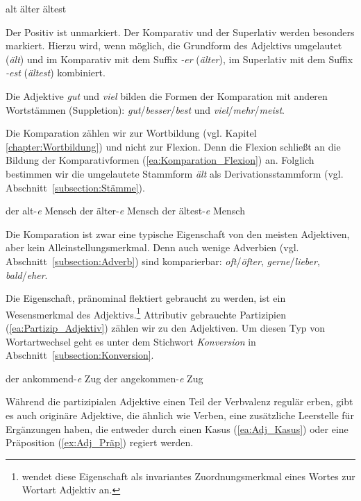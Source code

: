 \ea \label{ea:Komparation}
\ea \label{ea:Positiv} alt
\ex \label{ex:Komparativ} älter
\ex \label{ex:Superlativ} ältest
\z 
\z 

Der Positiv ist unmarkiert. Der Komparativ und der Superlativ werden besonders markiert. Hierzu wird, wenn möglich, die Grundform des Adjektivs umgelautet (\textit{ält}) und im Komparativ mit dem Suffix \textit{-er} (\textit{älter}), im Superlativ mit dem Suffix \textit{-est} (\textit{ältest}) kombiniert. 

Die Adjektive \textit{gut} und \textit{viel} bilden die Formen der Komparation mit anderen Wortstämmen (Suppletion): \textit{gut}/\textit{besser}/\textit{best} und \textit{viel}/\textit{mehr}/\textit{meist}.

Die Komparation zählen wir zur Wortbildung (vgl. Kapitel \ref{chapter:Wortbildung}) und nicht zur Flexion. Denn die Flexion schließt an die Bildung der Komparativformen (\ref{ea:Komparation_Flexion}) an. Folglich bestimmen wir die umgelautete Stammform \textit{ält} als Derivationsstammform (vgl. Abschnitt~\ref{subsection:Stämme}). 
 
\ea \label{ea:Komparation_Flexion}
\ea \label{ea:Positiv_Fx} der alt-\textit{e} Mensch
\ex \label{ex:Komparativ_Fx} der älter-\textit{e} Mensch
\ex \label{ex:Superlativ_Fx} der ältest-\textit{e} Mensch
\z 
\z  

Die Komparation ist zwar eine typische Eigenschaft von den meisten Adjektiven, aber kein Alleinstellungsmerkmal. Denn auch wenige Adverbien (vgl. Abschnitt~\ref{subsection:Adverb}) sind komparierbar: \textit{oft}/\textit{öfter}, \textit{gerne}/\textit{lieber}, \textit{bald}/\textit{eher}. 

Die Eigenschaft, pränominal flektiert gebraucht zu werden, ist ein Wesensmerkmal des Adjektivs.\footnote{\citet[335]{Engel2009} wendet diese Eigenschaft als invariantes Zuordnungsmerkmal eines Wortes zur Wortart Adjektiv an.} Attributiv gebrauchte Partizipien (\ref{ea:Partizip_Adjektiv}) zählen wir zu den Adjektiven. Um diesen Typ von Wortartwechsel geht es unter dem Stichwort \textit{Konversion} in Abschnitt~\ref{subsection:Konversion}.

\ea \label{ea:Partizip_Adjektiv}
\ea \label{ea:PI_Adjektiv} der ankommend-\textit{e} Zug
\ex \label{ex:PII_Adjektiv} der angekommen-\textit{e} Zug
\z 
\z 

Während die partizipialen Adjektive einen Teil der Verbvalenz regulär erben, gibt es auch originäre Adjektive, die ähnlich wie Verben, eine zusätzliche Leerstelle für Ergänzungen haben, die entweder durch einen Kasus (\ref{ea:Adj_Kasus}) oder eine Präposition (\ref{ex:Adj_Präp}) regiert werden.

